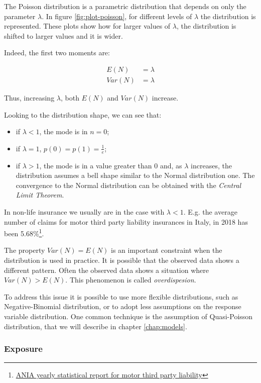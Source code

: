 \documentclass[a4paper, nobind]{templates/ociamthesis}
\providecommand{\tightlist}{%
  \setlength{\itemsep}{0pt}\setlength{\parskip}{0pt}}
\theoremstyle{definition}
\theoremstyle{definition}
\theoremstyle{definition}
\theoremstyle{remark}
\begin{document}
The Poisson distribution is a parametric distribution that depends on only the parameter \(\lambda\). In figure \ref{fig:plot-poisson}, for different levels of \(\lambda\) the distribution is represented. These plots show how for larger values of \(\lambda\), the distribution is shifted to larger values and it is wider.

Indeed, the first two moments are:

\begin{align*}
E(N)   & = \lambda \\
Var(N) & = \lambda
\end{align*}

Thus, increasing \(\lambda\), both \(E(N)\) and \(Var(N)\) increase.

Looking to the distribution shape, we can see that:

\begin{itemize}
\tightlist
\item
  if \(\lambda<1\), the mode is in \(n=0\);
\item
  if \(\lambda=1\), \(p(0)=p(1)=\frac{1}{e}\);
\item
  if \(\lambda>1\), the mode is in a value greater than \(0\) and, as \(\lambda\) increases, the distribution assumes a bell shape similar to the Normal distribution one. The convergence to the Normal distribution can be obtained with the \emph{Central Limit Theorem}.
\end{itemize}

In non-life insurance we usually are in the case with \(\lambda<1\). E.g. the average number of claims for motor third party liability insurances in Italy, in 2018 has been 5.68\%\footnote{\href{https://www.ania.it/ricerca-avanzata/-/asset_publisher/XIyLeujL9irt/content/id/113283}{ANIA yearly statistical report for motor third party liability}}.

The property \(Var(N) = E(N)\) is an important constraint when the distribution is used in practice. It is possible that the observed data shows a different pattern. Often the observed data shows a situation where \(Var(N) > E(N)\). This phenomenon is called \emph{overdispesion}.

To address this issue it is possible to use more flexible distributions, such as Negative-Binomial distribution, or to adopt less assumptions on the response variable distribution. One common technique is the assumption of Quasi-Poisson distribution, that we will describe in chapter \ref{chap:models}.

\hypertarget{exposure}{%
\subsubsection{Exposure}\label{exposure}}
\end{document}
